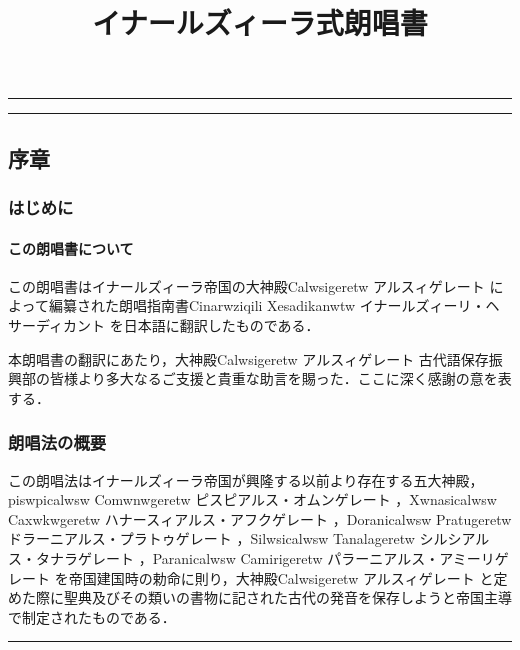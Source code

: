 \documentclass[
  japanese,
]{article}
\title{イナールズィーラ式朗唱書}
\author{}
\date{}
\begin{document}
\maketitle

{
\setcounter{tocdepth}{3}
\tableofcontents
}
\begin{center}\rule{0.5\linewidth}{0.5pt}\end{center}

\begin{center}\rule{0.5\linewidth}{0.5pt}\end{center}

\subsection{序章}\label{chapter1}

\subsubsection{はじめに}\label{section1.1}

\paragraph{この朗唱書について}\label{subsection1.1.1}

この朗唱書はイナールズィーラ帝国の大神殿{Calwsigeretw} アルスィゲレート
によって編纂された朗唱指南書{Cinarwziqili Xesadikanwtw}
イナールズィーリ・ヘサーディカント を日本語に翻訳したものである．

本朗唱書の翻訳にあたり，大神殿{Calwsigeretw} アルスィゲレート
古代語保存振興部の皆様より多大なるご支援と貴重な助言を賜った．ここに深く感謝の意を表する．

\subsubsection{朗唱法の概要}\label{section1.2}

この朗唱法はイナールズィーラ帝国が興隆する以前より存在する五大神殿，{piswpicalwsw
Comwnwgeretw} ピスピアルス・オムンゲレート ，{Xwnasicalwsw Caxwkwgeretw}
ハナースィアルス・アフクゲレート ，{Doranicalwsw Pratugeretw}
ドラーニアルス・プラトゥゲレート ，{Silwsicalwsw Tanalageretw}
シルシアルス・タナラゲレート ，{Paranicalwsw Camirigeretw}
パラーニアルス・アミーリゲレート
を帝国建国時の勅命に則り，大神殿{Calwsigeretw} アルスィゲレート
と定めた際に聖典及びその類いの書物に記された古代の発音を保存しようと帝国主導で制定されたものである．

\begin{center}\rule{0.5\linewidth}{0.5pt}\end{center}
\end{document}
